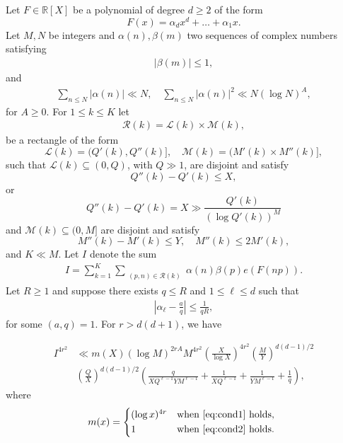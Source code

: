 \documentclass[10pt,a4paper]{amsart}
\def\R{{\mathbb R}}
\def\cL{{\mathcal L}}
\def\cM{{\mathcal M}}
\def\cR{{\mathcal R}}
\def\ge{\geqslant}
\def\le{\leqslant}
\begin{document}
\begin{lemma}
\label{lem:bilinear1}
Let $F\in \R[X]$ be a polynomial of degree $d\ge 2$  of the form 
$$F(x)=\alpha_d x^{d}+\dots +\alpha_1 x.$$
 Let $M,N$ be integers and $\alpha(n),\beta(m)$ two sequences of complex numbers satisfying 
\begin{align*}
|\beta(m)|\le 1,
\end{align*}
and
\begin{align}
\label{eq:condi}
\sum_{n\le N} |\alpha (n)| \ll N, \quad \sum_{n\le N} |\alpha (n)|^2 \ll N(\log{N})^A,
\end{align}
for $A \ge 0$.
For $1\le k \le K$ let 
\begin{align}
\label{eq:Rk}
\cR(k)=\cL(k)\times \cM(k),
\end{align}
 be a rectangle of the form 
$$\cL(k)=(Q'(k),Q''(k)], \quad \cM(k)=(M'(k)\times M''(k)],$$
such that $\cL(k)\subseteq (0,Q)$, with $Q\gg 1$, are disjoint and satisfy 
\begin{equation}
\label{eq:cond1}
Q''(k)-Q'(k)\le X,
\end{equation}
or
\begin{equation}
\label{eq:cond2}
Q''(k)-Q'(k)= X \gg \frac{ Q'(k)}{(\log Q'(k))^M}
\end{equation}
and $\cM(k)\subseteq (0,M]$ are disjoint and satisfy 
$$M''(k)-M'(k)\le Y, \quad M''(k)\le 2M'(k),$$
and $K\ll M$.
Let $I$ denote the sum 
\begin{align}
\label{eq:Idef}
I=\sum_{k=1}^{K}\sum_{\substack{(p,n)\in \cR(k)}}\alpha(n)\beta(p)e(F(np)).
\end{align}
Let $R\ge 1$ and suppose there exists $q\le R$ and $1\le \ell \le d$ such that 
\begin{align}
\label{eq:alassump}
\left|\alpha_{\ell}-\frac{a}{q}\right|\le \frac{1}{qR},
\end{align}
for some $(a,q)=1$. For $r>d(d+1)$, we have

\begin{align*}
I^{4r^2}& \ll m(X)(\log{M})^{2rA}M^{4r^2}\left(\frac{X}{\log{X}}\right)^{4r^2} \left(\frac{M}{Y}\right)^{d(d-1)/2}\\ &\left(\frac{Q}{X}\right)^{d(d-1)/2}  \left(\frac{q}{XQ^{\ell-1}YM^{\ell-1}}+\frac{1}{XQ^{\ell-1}}+\frac{1}{YM^{\ell-1}}+\frac{1}{q}\right),
\end{align*}
where
$$m(x)=\begin{cases*}
(\log{x})^{4r}& \textit{when} \eqref{eq:cond1} \textit{holds},\\
1 & \textit{when} \eqref{eq:cond2} \textit{holds}.
\end{cases*} $$
\end{lemma}
\end{document}
